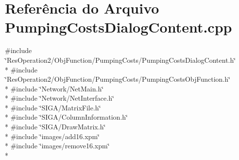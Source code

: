 \section{Referência do Arquivo Pumping\+Costs\+Dialog\+Content.\+cpp}
\label{_2_obj_function_2_pumping_costs_2_pumping_costs_dialog_content_8cpp}
{\ttfamily \#include \char`\"{}Res\+Operation2/\+Obj\+Function/\+Pumping\+Costs/\+Pumping\+Costs\+Dialog\+Content.\+h\char`\"{}}\\*
{\ttfamily \#include \char`\"{}Res\+Operation2/\+Obj\+Function/\+Pumping\+Costs/\+Pumping\+Costs\+Obj\+Function.\+h\char`\"{}}\\*
{\ttfamily \#include \char`\"{}Network/\+Net\+Main.\+h\char`\"{}}\\*
{\ttfamily \#include \char`\"{}Network/\+Net\+Interface.\+h\char`\"{}}\\*
{\ttfamily \#include \char`\"{}S\+I\+G\+A/\+Matrix\+File.\+h\char`\"{}}\\*
{\ttfamily \#include \char`\"{}S\+I\+G\+A/\+Column\+Information.\+h\char`\"{}}\\*
{\ttfamily \#include \char`\"{}S\+I\+G\+A/\+Draw\+Matrix.\+h\char`\"{}}\\*
{\ttfamily \#include \char`\"{}images/add16.\+xpm\char`\"{}}\\*
{\ttfamily \#include \char`\"{}images/remove16.\+xpm\char`\"{}}\\*
